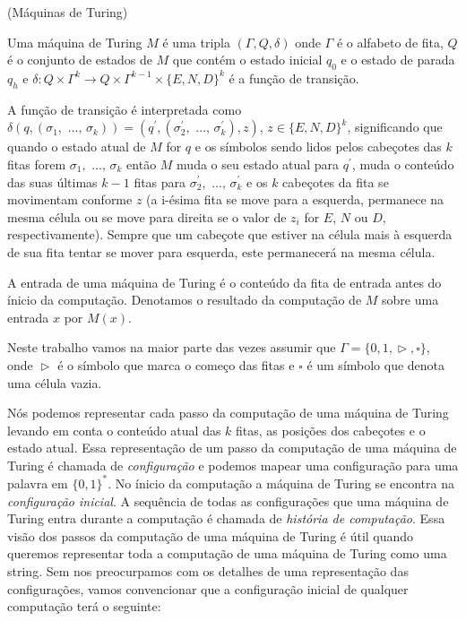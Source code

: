 \begin{defi}(Máquinas de Turing) \label{defi:MT}

Uma máquina de Turing $M$ é uma tripla $(\Gamma, Q, \delta)$ onde $\Gamma$ é o alfabeto de fita, $Q$ é o conjunto de estados de $M$ que contém o estado inicial $q_{0}$ e o estado de parada $q_{h}$ e $\delta: Q \times \Gamma^{k} \to Q \times \Gamma^{k - 1} \times \{E, N, D\}^{k}$ é a função de transição.

A função de transição é interpretada como $\delta(q, (\sigma_{1}, \text{ ..., } \sigma_{k})) = (q^{\prime}, (\sigma_{2}^{\prime}, \text{ ..., } \sigma_{k}^{\prime}), z)$, $z \in \{E, N, D\}^{k}$, significando que quando o estado atual de $M$ for $q$ e os símbolos sendo lidos pelos cabeçotes das $k$ fitas forem $\sigma_{1}, \text{ ..., } \sigma_{k}$ então $M$ muda o seu estado atual para $q^{\prime}$, muda o conteúdo das suas últimas $k - 1$ fitas para $\sigma_{2}^{\prime}, \text{ ..., } \sigma_{k}^{\prime}$ e os $k$ cabeçotes da fita se movimentam conforme $z$ (a i-ésima fita se move para a esquerda, permanece na mesma célula ou se move para direita se o valor de $z_{i}$ for $E$, $N$ ou $D$, respectivamente). Sempre que um cabeçote que estiver na célula mais à esquerda de sua fita tentar se mover para esquerda, este permanecerá na mesma célula.

A entrada de uma máquina de Turing é o conteúdo da fita de entrada antes do ínicio da computação. Denotamos o resultado da computação de $M$ sobre uma entrada $x$ por $M(x)$.

\end{defi}

Neste trabalho vamos na maior parte das vezes assumir que $\Gamma = \{0, 1, \vartriangleright, \square\}$, onde $\vartriangleright$ é o símbolo que marca o começo das fitas e $\square$ é um símbolo que denota uma célula vazia.

Nós podemos representar cada passo da computação de uma máquina de Turing levando em conta o conteúdo atual das $k$ fitas, as posições dos cabeçotes e o estado atual. Essa representação de um passo da computação de uma máquina de Turing é chamada de \emph{configuração} e podemos mapear uma configuração para uma palavra em $\{0, 1\}^{*}$. No ínicio da computação a máquina de Turing se encontra na \emph{configuração inicial}. A sequência de todas as configurações que uma máquina de Turing entra durante a computação é chamada de \emph{história de computação}. Essa visão dos passos da computação de uma máquina de Turing é útil quando queremos representar toda a computação de uma máquina de Turing como uma string. Sem nos preocurpamos com os detalhes de uma representação das configurações, vamos convencionar que a configuração inicial de qualquer computação terá o seguinte:


